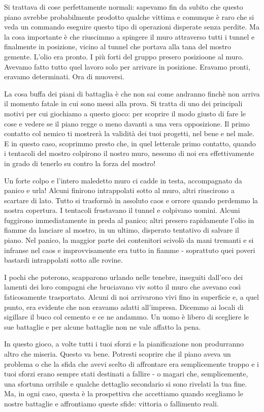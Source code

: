 Si trattava di cose perfettamente normali: sapevamo fin da subito che questo piano avrebbe probabilmente prodotto qualche vittima e comunque è raro che si veda un commando eseguire questo tipo di operazioni disperate senza perdite. Ma la cosa importante è che riuscimmo a spingere il muro attraverso tutti i tunnel e finalmente in posizione, vicino al tunnel che portava alla tana del mostro gemente. L'olio era pronto. I più forti del gruppo presero posizioone al muro. Avevamo fatto tutto quel lavoro solo per arrivare in posizione. Eravamo pronti, eravamo determinati. Ora di muoversi.

La cosa buffa dei piani di battaglia è che non sai come andranno finchè non arriva il momento fatale in cui sono messi alla prova. Si tratta di uno dei principali motivi per cui giochiamo a questo gioco: per scoprire il modo giusto di fare le cose e vedere se il piano regge o meno davanti a una vera opposizione. Il primo contatto col nemico ti mostrerà la validità dei tuoi progetti, nel bene e nel male. E in questo caso, scoprimmo presto che, in quel letterale primo contatto, quando i tentacoli del mostro colpirono il nostro muro, nessuno di noi era effettivamente in grado di tenerlo su contro la forza del mostro!

Un forte colpo e l'intero maledetto muro ci cadde in testa, accompagnato da panico e urla! Alcuni finirono intrappolati sotto al muro, altri riuscirono a scartare di lato. Tutto si trasformò in assoluto caos e orrore quando perdemmo la nostra copertura. I tentacoli frustavano il tunnel e colpivano uomini. Alcuni fuggirono immediatamente in preda al panico; altri presero rapidamente l'olio in fiamme da lanciare al mostro, in un ultimo, disperato tentativo di salvare il piano. Nel panico, la maggior parte dei contenitori scivolò da mani tremanti e si infranse nel caos e improvvisamente era tutto in fiamme - soprattuto quei poveri bastardi intrappolati sotto alle rovine.

I pochi che poterono, scapparono urlando nelle tenebre, inseguiti dall'eco dei lamenti dei loro compagni che bruciavano viv sotto il muro che avevano così faticosamente trasportato. Alcuni di noi arrivarono vivi fino in superficie e, a quel punto, era evidente che non eravamo adatti all'impresa. Dicemmo ai locali di sigillare il buco col cemento e ce ne andammo. Un uomo è libero di scegliere le sue battaglie e per alcune battaglie non ne vale affatto la pena.

In questo gioco, a volte tutti i tuoi sforzi e la pianificazione non produrranno altro che miseria. Questo va bene. Potresti scoprire che il piano aveva un problema o che la sfida che avevi scelto di affrontare era semplicemente troppo e i tuoi sforzi erano sempre stati destinati a fallire - o magari che, semplicemente, una sfortuna orribile e qualche dettaglio secondario si sono rivelati la tua fine. Ma, in ogni caso, questa è la prospettiva che accettiamo quando scegliamo le nostre battaglie e affrontiamo queste sfide: vittoria o fallimento reali.